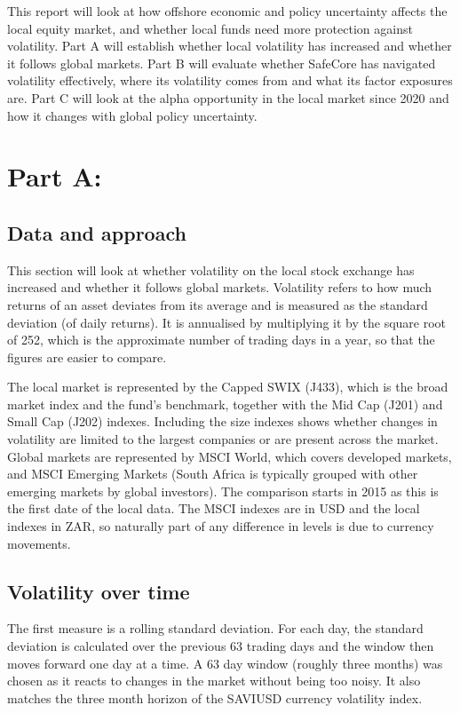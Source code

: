 \documentclass[11pt,preprint, authoryear]{elsarticle}
\numberwithin{equation}{section}
\numberwithin{figure}{section}
\numberwithin{table}{section}
\begin{document}
This report will look at how offshore economic and policy uncertainty
affects the local equity market, and whether local funds need more
protection against volatility. Part A will establish whether local
volatility has increased and whether it follows global markets. Part B
will evaluate whether SafeCore has navigated volatility effectively,
where its volatility comes from and what its factor exposures are. Part
C will look at the alpha opportunity in the local market since 2020 and
how it changes with global policy uncertainty.

\section{\texorpdfstring{Part A: \label{PartA}}{Part A: }}\label{part-a}

\subsection{Data and approach}\label{data-and-approach}

This section will look at whether volatility on the local stock exchange
has increased and whether it follows global markets. Volatility refers
to how much returns of an asset deviates from its average and is
measured as the standard deviation (of daily returns). It is annualised
by multiplying it by the square root of 252, which is the approximate
number of trading days in a year, so that the figures are easier to
compare.

The local market is represented by the Capped SWIX (J433), which is the
broad market index and the fund's benchmark, together with the Mid Cap
(J201) and Small Cap (J202) indexes. Including the size indexes shows
whether changes in volatility are limited to the largest companies or
are present across the market. Global markets are represented by MSCI
World, which covers developed markets, and MSCI Emerging Markets (South
Africa is typically grouped with other emerging markets by global
investors). The comparison starts in 2015 as this is the first date of
the local data. The MSCI indexes are in USD and the local indexes in
ZAR, so naturally part of any difference in levels is due to currency
movements.

\subsection{Volatility over time}\label{volatility-over-time}

The first measure is a rolling standard deviation. For each day, the
standard deviation is calculated over the previous 63 trading days and
the window then moves forward one day at a time. A 63 day window
(roughly three months) was chosen as it reacts to changes in the market
without being too noisy. It also matches the three month horizon of the
SAVIUSD currency volatility index.
\end{document}
